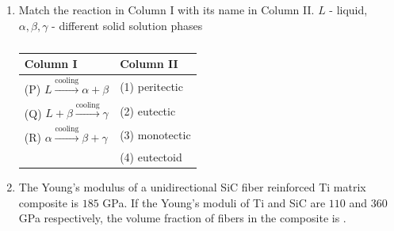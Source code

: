 \documentclass[a4paper,10pt]{article}
\begin{document}
\begin{enumerate}
    \hfill{}
    
    \item Match the reaction in Column I with its name in Column II.
    $L$ - liquid, $\alpha, \beta, \gamma$ - different solid solution phases
    \begin{table}[h!] \centering \caption*{} \label{tab:q13_material}
        \begin{tabular}{|l|l|} \hline
            \textbf{Column I} & \textbf{Column II} \\ \hline
            (P) $L \xrightarrow{\text{cooling}} \alpha + \beta$ & (1) peritectic \\
            (Q) $L + \beta \xrightarrow{\text{cooling}} \gamma$ & (2) eutectic \\
            (R) $\alpha \xrightarrow{\text{cooling}} \beta + \gamma$ & (3) monotectic \\
            & (4) eutectoid \\ \hline
        \end{tabular}
    \end{table}
    
    \hfill{}
    \begin{enumerate}[label=\Alph*)]
    \end{enumerate}

    \item The Young's modulus of a unidirectional SiC fiber reinforced Ti matrix composite is $185$ GPa. If the Young's moduli of Ti and SiC are $110$ and $360$ GPa respectively, the volume fraction of fibers in the composite is \underline{\hspace{2cm}}.
    
    \hfill{}


\end{enumerate}
\end{document}
